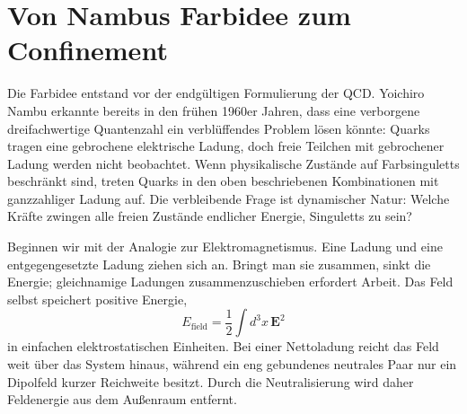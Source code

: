 \begin{classroomqa}
\end{classroomqa}

\begin{classroomqa}
\end{classroomqa}

\section{Von Nambus Farbidee zum Confinement}

Die Farbidee entstand vor der endgültigen Formulierung der QCD. Yoichiro Nambu erkannte bereits in den frühen 1960er Jahren, dass eine verborgene dreifachwertige Quantenzahl ein verblüffendes Problem lösen könnte: Quarks tragen eine gebrochene elektrische Ladung, doch freie Teilchen mit gebrochener Ladung werden nicht beobachtet. Wenn physikalische Zustände auf Farbsinguletts beschränkt sind, treten Quarks in den oben beschriebenen Kombinationen mit ganzzahliger Ladung auf. Die verbleibende Frage ist dynamischer Natur: Welche Kräfte zwingen alle freien Zustände endlicher Energie, Singuletts zu sein?

Beginnen wir mit der Analogie zur Elektromagnetismus. Eine Ladung und eine entgegengesetzte Ladung ziehen sich an. Bringt man sie zusammen, sinkt die Energie; gleichnamige Ladungen zusammenzuschieben erfordert Arbeit. Das Feld selbst speichert positive Energie,
\begin{equation}
E_{\mathrm{field}}
=\frac12\int d^3x\,\boldsymbol E^2
\end{equation}
in einfachen elektrostatischen Einheiten. Bei einer Nettoladung reicht das Feld weit über das System hinaus, während ein eng gebundenes neutrales Paar nur ein Dipolfeld kurzer Reichweite besitzt. Durch die Neutralisierung wird daher Feldenergie aus dem Außenraum entfernt.


